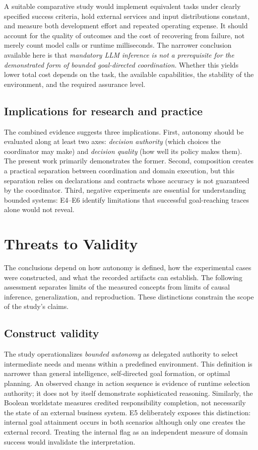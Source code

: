 \documentclass[11pt]{article}
\begin{document}
A suitable comparative study would implement equivalent tasks under clearly specified success criteria, hold external services and input distributions constant, and measure both development effort and repeated operating expense. It should account for the quality of outcomes and the cost of recovering from failure, not merely count model calls or runtime milliseconds. The narrower conclusion available here is that \emph{mandatory LLM inference is not a prerequisite for the demonstrated form of bounded goal-directed coordination}. Whether this yields lower total cost depends on the task, the available capabilities, the stability of the environment, and the required assurance level.

\subsection{Implications for research and practice}
The combined evidence suggests three implications. First, autonomy should be evaluated along at least two axes: \emph{decision authority} (which choices the coordinator may make) and \emph{decision quality} (how well its policy makes them). The present work primarily demonstrates the former. Second, composition creates a practical separation between coordination and domain execution, but this separation relies on declarations and contracts whose accuracy is not guaranteed by the coordinator. Third, negative experiments are essential for understanding bounded systems: E4--E6 identify limitations that successful goal-reaching traces alone would not reveal.


\section{Threats to Validity}
The conclusions depend on how autonomy is defined, how the experimental cases were constructed, and what the recorded artifacts can establish. The following assessment separates limits of the measured concepts from limits of causal inference, generalization, and reproduction. These distinctions constrain the scope of the study's claims.

\subsection{Construct validity}
The study operationalizes \emph{bounded autonomy} as delegated authority to select intermediate needs and means within a predefined environment. This definition is narrower than general intelligence, self-directed goal formation, or optimal planning. An observed change in action sequence is evidence of runtime selection authority; it does not by itself demonstrate sophisticated reasoning. Similarly, the Boolean worldstate measures credited responsibility completion, not necessarily the state of an external business system. E5 deliberately exposes this distinction: internal goal attainment occurs in both scenarios although only one creates the external record. Treating the internal flag as an independent measure of domain success would invalidate the interpretation.
\end{document}
